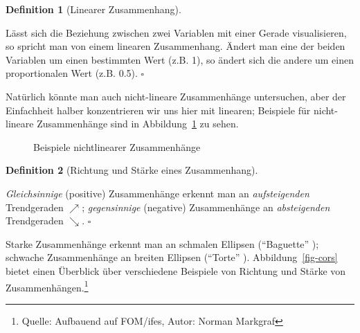 \documentclass[
  letterpaper,
]{scrbook}
\theoremstyle{definition}
\theoremstyle{definition}
\theoremstyle{definition}
\newtheorem{definition}{Definition}[chapter]
\theoremstyle{remark}
\begin{document}
\begin{definition}[Linearer
Zusammenhang]\protect\hypertarget{def-lin-zshg}{}\label{def-lin-zshg}

Lässt sich die Beziehung zwischen zwei Variablen mit einer Gerade
visualisieren, so spricht man von einem linearen Zusammenhang. Ändert
man eine der beiden Variablen um einen bestimmten Wert (z.B. 1), so
ändert sich die andere um einen proportionalen Wert (z.B. 0.5).
\(\square\)

\end{definition}

Natürlich könnte man auch nicht-lineare Zusammenhänge untersuchen, aber
der Einfachheit halber konzentrieren wir uns hier mit linearen;
Beispiele für nicht-lineare Zusammenhänge sind in
Abbildung~\ref{fig-nonlinear} zu sehen.

\begin{figure}


\caption{\label{fig-nonlinear}Beispiele nichtlinearer Zusammenhänge}

\end{figure}%

\begin{definition}[Richtung und Stärke eines
Zusammenhang]\protect\hypertarget{def-zshg}{}\label{def-zshg}

\emph{Gleichsinnige} (positive) Zusammenhänge erkennt man an
\emph{aufsteigenden} Trendgeraden \(\nearrow\); \emph{gegensinnige}
(negative) Zusammenhänge an \emph{absteigenden} Trendgeraden
\(\searrow\). \(\square\)

\end{definition}

Starke Zusammenhänge erkennt man an schmalen Ellipsen
(\enquote{Baguette} ); schwache Zusammenhänge an breiten Ellipsen
(\enquote{Torte} ). Abbildung~\ref{fig-cors} bietet einen Überblick über
verschiedene Beispiele von Richtung und Stärke von
Zusammenhängen.\footnote{Quelle: Aufbauend auf FOM/ifes, Autor: Norman
  Markgraf}
\end{document}
